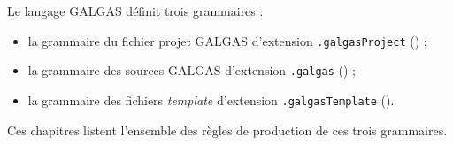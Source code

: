 

Le langage GALGAS définit trois grammaires :
\begin{itemize}
\item la grammaire du fichier projet GALGAS d'extension \texttt{.galgasProject} () ;
\item la grammaire des sources GALGAS d'extension \texttt{.galgas} () ;
\item la grammaire des fichiers \emph{template} d'extension \texttt{.galgasTemplate} ().
\end{itemize}

Ces chapitres listent l'ensemble des règles de production de ces trois grammaires.






